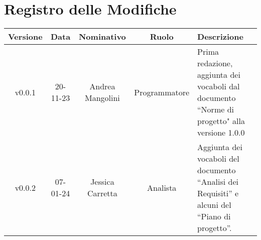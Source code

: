 \section*{\Large Registro delle Modifiche}
    \begin{table}[h]
        \centering
        \renewcommand\tabularxcolumn[1]{m{#1}} %
        \renewcommand{\arraystretch}{1.5}
        \begin{tabularx}{0.98\textwidth}
            {c|c|c|c|>{\centering\arraybackslash}X}
            \rowcolor{black}
            \textbf{\color{white} Versione} & \textbf{\color{white} Data} & \textbf{\color{white} Nominativo} & \textbf{\color{white} Ruolo} & \textbf{\color{white} Descrizione} \\ 
            \hline

            v0.0.1 & 20-11-23 & Andrea Mangolini & Programmatore & Prima redazione, aggiunta dei vocaboli dal documento ``Norme di progetto" alla versione 1.0.0 \\
            v0.0.2 & 07-01-24 & Jessica Carretta & Analista & Aggiunta dei vocaboli del documento ``Analisi dei Requisiti'' e alcuni del ``Piano di progetto''. \\
            \hline
        \end{tabularx}
    \end{table}